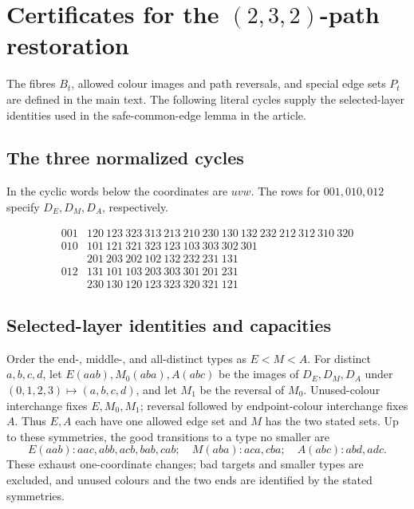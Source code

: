 \documentclass[11pt]{article}
\numberwithin{equation}{section}
\numberwithin{table}{section}
\begin{document}
\clearpage
\section{Certificates for the \texorpdfstring{$(2,3,2)$}{(2,3,2)}-path restoration}
\label{app:path232-certificates}
The fibres $B_t$, allowed colour images and path reversals, and special
edge sets $P_t$ are defined in the main text. The following literal
cycles supply the selected-layer identities used in
the safe-common-edge lemma in the article.

\subsection{The three normalized cycles}
In the cyclic words below the coordinates are $uvw$. The rows for
$001,010,012$ specify $D_E,D_M,D_A$, respectively.

\begin{equation}
\label{eq:path232-cycles}
\begin{array}{c|l}
001&120\ 123\ 323\ 313\ 213\ 210\ 230\ 130\ 132\ 232\ 212\ 312\ 310\ 320\\[2pt]
010&101\ 121\ 321\ 323\ 123\ 103\ 303\ 302\ 301\\
   &201\ 203\ 202\ 102\ 132\ 232\ 231\ 131\\[2pt]
012&131\ 101\ 103\ 203\ 303\ 301\ 201\ 231\\
   &230\ 130\ 120\ 123\ 323\ 320\ 321\ 121
\end{array}
\end{equation}

\subsection{Selected-layer identities and capacities}
Order the end-, middle-, and all-distinct types as $E<M<A$.
For distinct $a,b,c,d$, let $E(aab),M_0(aba),A(abc)$ be the images of
$D_E,D_M,D_A$ under $(0,1,2,3)\mapsto(a,b,c,d)$, and let $M_1$ be
the reversal of $M_0$. Unused-colour interchange fixes $E,M_0,M_1$;
reversal followed by endpoint-colour interchange fixes $A$. Thus
$E,A$ each have one allowed edge set and $M$ has the two stated sets.
Up to these symmetries, the good transitions to a type no smaller are
\[
E(aab):aac,abb,acb,bab,cab;\quad
M(aba):aca,cba;\quad A(abc):abd,adc.
\]
These exhaust one-coordinate changes; bad targets and smaller types
are excluded, and unused colours and the two ends are identified
by the stated symmetries.
\end{document}
